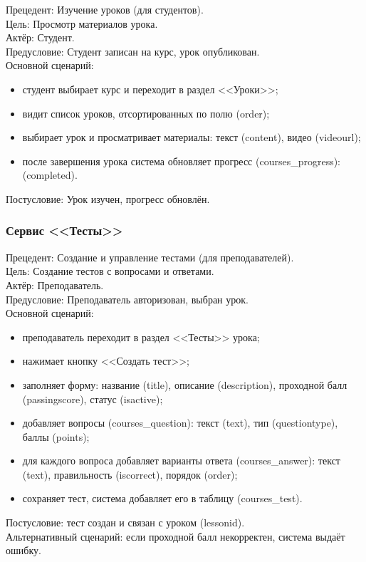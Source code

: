 	{Прецедент: Изучение уроков (для студентов)}. \\
	{Цель}: Просмотр материалов урока. \\
	{Актёр}: Студент. \\
	{Предусловие}: Студент записан на курс, урок опубликован. \\
	{Основной сценарий}:
	\begin{itemize}
		\item студент выбирает курс и переходит в раздел <<Уроки>>;
		\item видит список уроков, отсортированных по полю (order);
		\item выбирает урок и просматривает материалы: текст (content), видео (videourl);
		\item после завершения урока система обновляет прогресс (courses\_progress): (completed).
	\end{itemize}
	{Постусловие}: Урок изучен, прогресс обновлён.
	
\subsubsection{Сервис <<Тесты>>}
	
	{Прецедент: Создание и управление тестами (для преподавателей)}. \\
	{Цель}: Создание тестов с вопросами и ответами. \\
	{Актёр}: Преподаватель. \\
	{Предусловие}: Преподаватель авторизован, выбран урок. \\
	{Основной сценарий}:
	\begin{itemize}
		\item преподаватель переходит в раздел <<Тесты>> урока;
		\item нажимает кнопку <<Создать тест>>;
		\item заполняет форму: название (title), описание (description), проходной балл (passingscore), статус (isactive);
		\item добавляет вопросы (courses\_question): текст (text), тип (questiontype), баллы (points);
		\item для каждого вопроса добавляет варианты ответа (courses\_answer): текст (text), правильность (iscorrect), порядок (order);
		\item сохраняет тест, система добавляет его в таблицу (courses\_test).
	\end{itemize}
	{Постусловие}: тест создан и связан с уроком (lessonid). \\
	{Альтернативный сценарий}: если проходной балл некорректен, система выдаёт ошибку.
	
